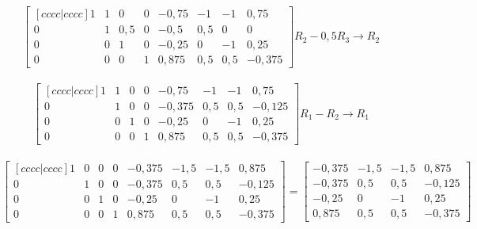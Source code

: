 \\
\[
    \begin{bmatrix}[cccc|cccc]
        1 & 1 & 0   & 0 & -0,75 & -1  & -1  & 0,75   \\
        0 & 1 & 0,5 & 0 & -0,5  & 0,5 & 0   & 0      \\
        0 & 0 & 1   & 0 & -0,25 & 0   & -1  & 0,25   \\
        0 & 0 & 0   & 1 & 0,875 & 0,5 & 0,5 & -0,375
    \end{bmatrix}
    R_2 - 0,5R_3\to R_2
\]
\\
\[
    \begin{bmatrix}[cccc|cccc]
        1 & 1 & 0 & 0 & -0,75  & -1  & -1  & 0,75   \\
        0 & 1 & 0 & 0 & -0,375 & 0,5 & 0,5 & -0,125 \\
        0 & 0 & 1 & 0 & -0,25  & 0   & -1  & 0,25   \\
        0 & 0 & 0 & 1 & 0,875  & 0,5 & 0,5 & -0,375
    \end{bmatrix}
    R_1 - R_2\to R_1
\]
\\
\begin{equation}
    \begin{bmatrix}[cccc|cccc]
        1 & 0 & 0 & 0 & -0,375 & -1,5 & -1,5 & 0,875  \\
        0 & 1 & 0 & 0 & -0,375 & 0,5  & 0,5  & -0,125 \\
        0 & 0 & 1 & 0 & -0,25  & 0    & -1   & 0,25   \\
        0 & 0 & 0 & 1 & 0,875  & 0,5  & 0,5  & -0,375
    \end{bmatrix} =
    \begin{bmatrix}
        -0,375 & -1,5 & -1,5 & 0,875  \\
        -0,375 & 0,5  & 0,5  & -0,125 \\
        -0,25  & 0    & -1   & 0,25   \\
        0,875  & 0,5  & 0,5  & -0,375
    \end{bmatrix}
\end{equation}
\\